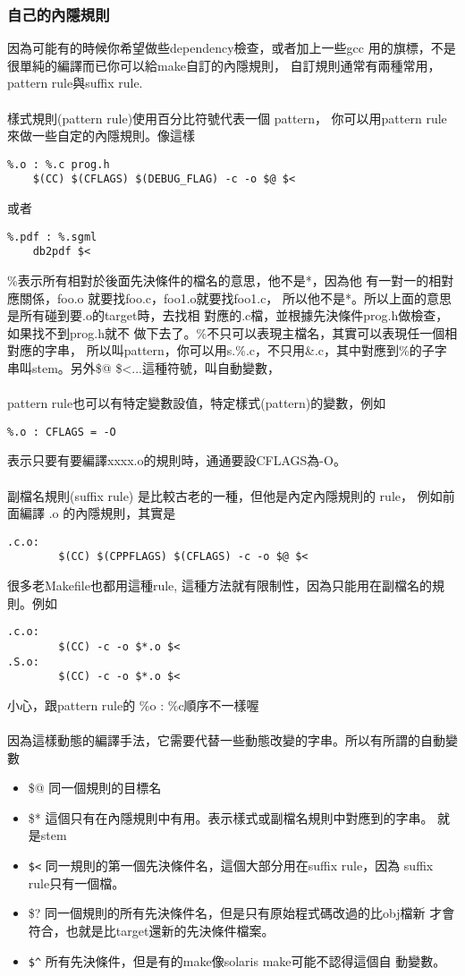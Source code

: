  \subsubsection{自己的內隱規則}
  因為可能有的時候你希望做些dependency檢查，或者加上一些gcc
  用的旗標，不是很單純的編譯而已你可以給make自訂的內隱規則，
  自訂規則通常有兩種常用，pattern rule與suffix rule.
  \\\\
  樣式規則(pattern rule)使用百分比符號代表一個 pattern，
  你可以用pattern rule來做一些自定的內隱規則。像這樣
  \begin{verbatim}
%.o : %.c prog.h
	$(CC) $(CFLAGS) $(DEBUG_FLAG) -c -o $@ $<
  \end{verbatim}
  或者
  \begin{verbatim}
%.pdf : %.sgml
	db2pdf $<
  \end{verbatim}
  \%表示所有相對於後面先決條件的檔名的意思，他不是*，因為他
  有一對一的相對應關係，foo.o 就要找foo.c，foo1.o就要找foo1.c，
  所以他不是*。所以上面的意思是所有碰到要.o的target時，去找相
  對應的.c檔，並根據先決條件prog.h做檢查，如果找不到prog.h就不
  做下去了。\%不只可以表現主檔名，其實可以表現任一個相對應的字串，
  所以叫pattern，你可以用s.\%.c，不只用\&.c，其中對應到\%的子字
  串叫stem。另外\$@ \$<...這種符號，叫自動變數，
  \\\\
  pattern rule也可以有特定變數設值，特定樣式(pattern)的變數，例如
  \begin{verbatim}
%.o : CFLAGS = -O
  \end{verbatim}
  表示只要有要編譯xxxx.o的規則時，通通要設CFLAGS為-O。
  \\\\
  副檔名規則(suffix rule) 是比較古老的一種，但他是內定內隱規則的 rule，
  例如前面編譯 .o 的內隱規則，其實是
  \begin{verbatim}
.c.o:
        $(CC) $(CPPFLAGS) $(CFLAGS) -c -o $@ $<
  \end{verbatim}
  很多老Makefile也都用這種rule, 這種方法就有限制性，因為只能用在副檔名的規
  則。例如
  \begin{verbatim}
.c.o:
        $(CC) -c -o $*.o $<
.S.o:
        $(CC) -c -o $*.o $<
  \end{verbatim}
  小心，跟pattern rule的 \%o : \%c順序不一樣喔
  \\\\    
  因為這樣動態的編譯手法，它需要代替一些動態改變的字串。所以有所謂的自動變數
  \begin{itemize}
    \item \$@   同一個規則的目標名
    \item \$*   這個只有在內隱規則中有用。表示樣式或副檔名規則中對應到的字串。
      就是stem
    \item \verb=$<=   同一規則的第一個先決條件名，這個大部分用在suffix rule，因為
	suffix rule只有一個檔。
    \item \$?   同一個規則的所有先決條件名，但是只有原始程式碼改過的比obj檔新
      才會符合，也就是比target還新的先決條件檔案。
    \item \verb=$^=   所有先決條件，但是有的make像solaris make可能不認得這個自
      動變數。
  \end{itemize}
